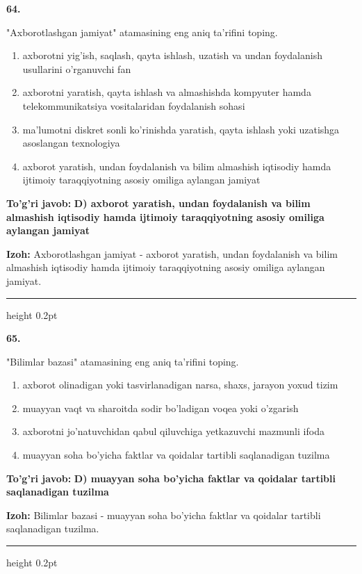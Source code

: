 \documentclass[10pt,a4paper,oneside]{article}
\begin{document}
\noindent\textbf{\color{ink}64.}
\par
"Axborotlashgan jamiyat" atamasining eng aniq ta'rifini toping.
\begin{enumerate}[label=\Alph*),leftmargin=9mm]
\item axborotni yig'ish, saqlash, qayta ishlash, uzatish va undan foydalanish usullarini o'rganuvchi fan
\item axborotni yaratish, qayta ishlash va almashishda kompyuter hamda telekommunikatsiya vositalaridan foydalanish sohasi
\item ma'lumotni diskret sonli ko'rinishda yaratish, qayta ishlash yoki uzatishga asoslangan texnologiya
\item axborot yaratish, undan foydalanish va bilim almashish iqtisodiy hamda ijtimoiy taraqqiyotning asosiy omiliga aylangan jamiyat
\end{enumerate}
\begin{tcolorbox}[enhanced,breakable,colback=teal!4,colframe=teal!50!black,boxrule=0.5pt,arc=1.1mm,left=3mm,right=3mm,top=1.7mm,bottom=1.7mm,before skip=2mm,after skip=2mm]
\textbf{\color{teal}To'g'ri javob:} \textbf{D) axborot yaratish, undan foydalanish va bilim almashish iqtisodiy hamda ijtimoiy taraqqiyotning asosiy omiliga aylangan jamiyat}
\par\smallskip
\textbf{Izoh:} Axborotlashgan jamiyat - axborot yaratish, undan foydalanish va bilim almashish iqtisodiy hamda ijtimoiy taraqqiyotning asosiy omiliga aylangan jamiyat.
\end{tcolorbox}
\vspace{2mm}\hrule height 0.2pt \vspace{3mm}

\noindent\textbf{\color{ink}65.}
\par
"Bilimlar bazasi" atamasining eng aniq ta'rifini toping.
\begin{enumerate}[label=\Alph*),leftmargin=9mm]
\item axborot olinadigan yoki tasvirlanadigan narsa, shaxs, jarayon yoxud tizim
\item muayyan vaqt va sharoitda sodir bo'ladigan voqea yoki o'zgarish
\item axborotni jo'natuvchidan qabul qiluvchiga yetkazuvchi mazmunli ifoda
\item muayyan soha bo'yicha faktlar va qoidalar tartibli saqlanadigan tuzilma
\end{enumerate}
\begin{tcolorbox}[enhanced,breakable,colback=teal!4,colframe=teal!50!black,boxrule=0.5pt,arc=1.1mm,left=3mm,right=3mm,top=1.7mm,bottom=1.7mm,before skip=2mm,after skip=2mm]
\textbf{\color{teal}To'g'ri javob:} \textbf{D) muayyan soha bo'yicha faktlar va qoidalar tartibli saqlanadigan tuzilma}
\par\smallskip
\textbf{Izoh:} Bilimlar bazasi - muayyan soha bo'yicha faktlar va qoidalar tartibli saqlanadigan tuzilma.
\end{tcolorbox}
\vspace{2mm}\hrule height 0.2pt \vspace{3mm}
\end{document}
